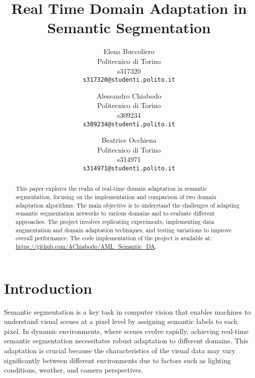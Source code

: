 \documentclass[10pt,twocolumn,letterpaper]{article}
\begin{document}
\title{Real Time Domain Adaptation in Semantic Segmentation}

\author{
Elena Buccoliero\\ 
Politecnico di Torino\\ 
s317320\\  
{\tt\small s317320@studenti.polito.it}
\and
Alessandro Chiabodo\\
Politecnico di Torino\\ 
s309234\\
{\tt\small s309234@studenti.polito.it}
\and
Beatrice Occhiena\\ 
Politecnico di Torino\\ 
s314971\\  
{\tt\small s314971@studenti.polito.it}
}
\maketitle

\begin{abstract}
    This paper explores the realm of real-time domain adaptation in semantic segmentation, focusing on the implementation and comparison of two domain adaptation algorithms. The main objective is to understand the challenges of adapting semantic segmentation networks to various domains and to evaluate different approaches. The project involves replicating experiments, implementing data augmentation and domain adaptation techniques, and testing variations to improve overall performance. The code implementation of the project is available at: \url{https://github.com/AChiabodo/AML_Semantic_DA}.
\end{abstract}

\section{Introduction}
\label{sec:intro}

Semantic segmentation is a key task in computer vision that enables machines to understand visual scenes at a pixel level by assigning semantic labels to each pixel. 
In dynamic environments, where scenes evolve rapidly, achieving real-time semantic segmentation necessitates robust adaptation to different domains. This adaptation is crucial because the characteristics of the visual data may vary significantly between different environments due to factors such as lighting conditions, weather, and camera perspectives.
\end{document}
